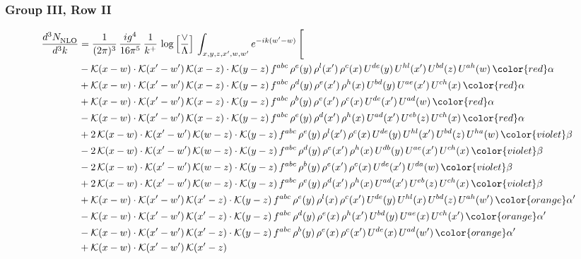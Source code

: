 \subsubsection{Group III, Row II}
\begin{align}
     \frac{d^{3}N_{\rm NLO}^{\rm}}{d^{3}k}  & = \frac{1}{(2\pi)^{3}}\, \frac{ig^{4}}{16\pi^{5}}\, \frac{1}{k^{+}}\, \log{\left[\frac{\vee}{\Lambda}\right]}\, \int_{x,y,z,x^{\prime},w,w^{\prime}}e^{-ik(w^{\prime}-w)}\, \Bigg[\notag \\ & -\mathcal{K}(x-w)\cdot \mathcal{K}(x'-w')\, \mathcal{K}(x-z)\cdot \mathcal{K}(y-z)\, f^{abc}\, \rho^{e}(y)\,\rho^{l}(x')\,\rho^{c}(x)\,U^{de}(y)\,U^{hl}(x')\,U^{bd}(z)\,U^{ah}(w)\, {\color{red}\alpha} \notag \\ & +\mathcal{K}(x-w)\cdot \mathcal{K}(x'-w')\, \mathcal{K}(x-z)\cdot \mathcal{K}(y-z)\, f^{abc}\, \rho^{d}(y)\,\rho^{e}(x')\,\rho^{h}(x)\,U^{bd}(y)\,U^{ae}(x')\,U^{ch}(x)\, {\color{red}\alpha} \notag \\ & + \mathcal{K}(x-w)\cdot \mathcal{K}(x'-w')\, \mathcal{K}(x-z)\cdot \mathcal{K}(y-z)\, f^{abc}\, \rho^{b}(y)\,\rho^{e}(x')\,\rho^{c}(x)\,U^{de}(x')\,U^{ad}(w)\, {\color{red}\alpha} \notag \\ & -\mathcal{K}(x-w)\cdot \mathcal{K}(x'-w')\, \mathcal{K}(x-z)\cdot \mathcal{K}(y-z)\, f^{abc}\, \rho^{e}(y)\,\rho^{d}(x')\,\rho^{h}(x)\,U^{ad}(x')\,U^{eb}(z)\,U^{ch}(x)\, {\color{red}\alpha} \notag \\ & +2\, \mathcal{K}(x-w)\cdot \mathcal{K}(x'-w')\, \mathcal{K}(w-z) \cdot \mathcal{K}(y-z)\, f^{abc}\, \rho^{e}(y)\,\rho^{l}(x')\, \rho^{c}(x)\, U^{de}(y)\,U^{hl}(x')\,U^{bd}(z)\,U^{ha}(w)\, {\color{violet} \beta} \notag \\ & -2\, \mathcal{K}(x-w)\cdot \mathcal{K}(x'-w')\, \mathcal{K}(w-z) \cdot \mathcal{K}(y-z)\, f^{abc}\, \rho^{d}(y)\,\rho^{e}(x')\, \rho^{h}(x)\, U^{db}(y)\,U^{ae}(x')\,U^{ch}(x)\, {\color{violet} \beta}\notag \\ & -2\, \mathcal{K}(x-w)\cdot \mathcal{K}(x'-w')\, \mathcal{K}(w-z) \cdot \mathcal{K}(y-z)\, f^{abc}\, \rho^{b}(y)\,\rho^{e}(x')\, \rho^{c}(x)\, U^{de}(x')\,U^{da}(w)\, {\color{violet} \beta}\notag \\ & + 2\, \mathcal{K}(x-w)\cdot \mathcal{K}(x'-w')\, \mathcal{K}(w-z) \cdot \mathcal{K}(y-z)\, f^{abc}\, \rho^{e}(y)\,\rho^{d}(x')\, \rho^{h}(x)\, U^{ad}(x')\,U^{eb}(z)\,U^{ch}(x)\, {\color{violet} \beta}\notag \\ & + \mathcal{K}(x-w)\cdot \mathcal{K}(x'-w')\, \mathcal{K}(x'-z) \cdot \mathcal{K}(y-z)\, f^{abc}\, \rho^{e}(y)\, \rho^{l}(x)\, \rho^{c}(x')\, U^{de}(y)\,U^{hl}(x)\, U^{bd}(z)\,U^{ah}(w')\, {\color{orange} \alpha'} \notag \\ & - \mathcal{K}(x-w)\cdot \mathcal{K}(x'-w')\, \mathcal{K}(x'-z) \cdot \mathcal{K}(y-z)\, f^{abc}\, \rho^{d}(y)\, \rho^{e}(x)\, \rho^{h}(x')\, U^{bd}(y)\,U^{ae}(x)\, U^{ch}(x')\, {\color{orange} \alpha'} \notag \\ & - \mathcal{K}(x-w)\cdot \mathcal{K}(x'-w')\, \mathcal{K}(x'-z) \cdot \mathcal{K}(y-z)\, f^{abc}\, \rho^{b}(y)\, \rho^{e}(x)\, \rho^{c}(x')\, U^{de}(x)\,U^{ad}(w')\, {\color{orange} \alpha'} \notag \\ & + \mathcal{K}(x-w)\cdot \mathcal{K}(x'-w')\, \mathcal{K}(x'-z) 
\end{align}
